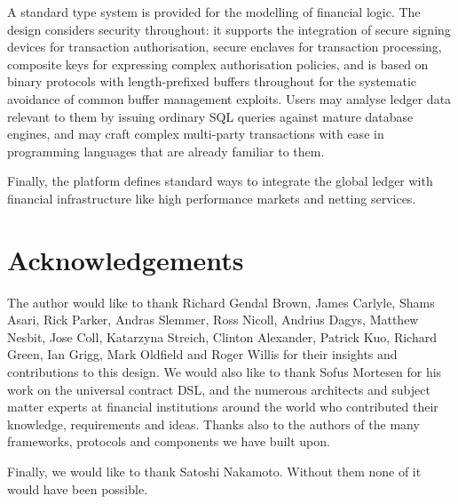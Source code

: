 \documentclass{article}
\begin{document}
A standard type system is provided for the modelling of financial logic. The design considers security throughout: it
supports the integration of secure signing devices for transaction authorisation, secure enclaves for transaction
processing, composite keys for expressing complex authorisation policies, and is based on binary protocols with
length-prefixed buffers throughout for the systematic avoidance of common buffer management exploits. Users may analyse
ledger data relevant to them by issuing ordinary SQL queries against mature database engines, and may craft complex
multi-party transactions with ease in programming languages that are already familiar to them.

Finally, the platform defines standard ways to integrate the global ledger with financial infrastructure like high
performance markets and netting services.

\section{Acknowledgements}

The author would like to thank Richard Gendal Brown, James Carlyle, Shams Asari, Rick Parker, Andras Slemmer, Ross
Nicoll, Andrius Dagys, Matthew Nesbit, Jose Coll, Katarzyna Streich, Clinton Alexander, Patrick Kuo, Richard Green, Ian
Grigg, Mark Oldfield and Roger Willis for their insights and contributions to this design. We would also like to thank
Sofus Mortesen for his work on the universal contract DSL, and the numerous architects and subject matter experts
at financial institutions around the world who contributed their knowledge, requirements and ideas. Thanks also to
the authors of the many frameworks, protocols and components we have built upon.

Finally, we would like to thank Satoshi Nakamoto. Without them none of it would have been possible.



\end{document}
